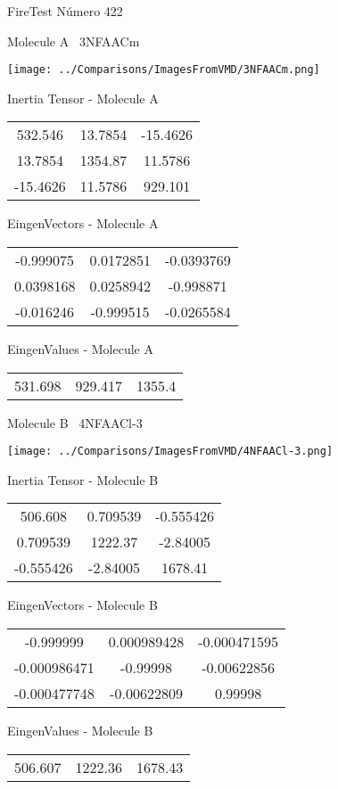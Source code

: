 \vtab[-3cm]
\begin{center}
{\large FireTest \tab Número 422}
\end{center}
\begin{multicols}{2}
\begin{center}

Molecule A \
3NFAACm

\texttt{[image: ../Comparisons/ImagesFromVMD/3NFAACm.png]}

Inertia Tensor - Molecule A \\
\begin{tabular}{|c c c|}
532.546	 & 	13.7854	 & 	-15.4626	 \\
13.7854	 & 	1354.87	 & 	11.5786	 \\
-15.4626	 & 	11.5786	 & 	929.101
\end{tabular}

\vtab
 EingenVectors - Molecule A     \\
\begin{tabular}{|c c c|}
-0.999075	 & 	0.0172851	 & 	-0.0393769	 \\
0.0398168	 & 	0.0258942	 & 	-0.998871	 \\
-0.016246	 & 	-0.999515	 & 	-0.0265584
\end{tabular}

\vtab
 EingenValues - Molecule A     \\
\begin{tabular}{|c c c|}
531.698	 & 	929.417	 & 	1355.4	 \\
\end{tabular}
\columnbreak

Molecule B \
4NFAACl-3

\texttt{[image: ../Comparisons/ImagesFromVMD/4NFAACl-3.png]}

Inertia Tensor - Molecule B \\
\begin{tabular}{|c c c|}
506.608	 & 	0.709539	 & 	-0.555426	 \\
0.709539	 & 	1222.37	 & 	-2.84005	 \\
-0.555426	 & 	-2.84005	 & 	1678.41
\end{tabular}

\vtab
 EingenVectors - Molecule B     \\
\begin{tabular}{|c c c|}
-0.999999	 & 	0.000989428	 & 	-0.000471595	 \\
-0.000986471	 & 	-0.99998	 & 	-0.00622856	 \\
-0.000477748	 & 	-0.00622809	 & 	0.99998
\end{tabular}

\vtab
 EingenValues - Molecule B     \\
\begin{tabular}{|c c c|}
506.607	 & 	1222.36	 & 	1678.43	 \\
\end{tabular}

\end{center}
\end{multicols}

